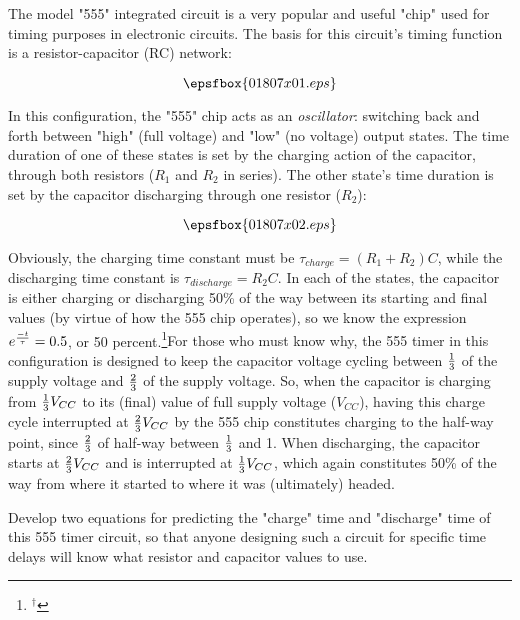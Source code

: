 

The model "555" integrated circuit is a very popular and useful "chip" used for timing purposes in electronic circuits.  The basis for this circuit's timing function is a resistor-capacitor (RC) network:

$$\epsfbox{01807x01.eps}$$

In this configuration, the "555" chip acts as an {\it oscillator}: switching back and forth between "high" (full voltage) and "low" (no voltage) output states.  The time duration of one of these states is set by the charging action of the capacitor, through both resistors ($R_1$ and $R_2$ in series).  The other state's time duration is set by the capacitor discharging through one resistor ($R_2$):

$$\epsfbox{01807x02.eps}$$

Obviously, the charging time constant must be $\tau_{charge} = (R_1 + R_2)C$, while the discharging time constant is $\tau_{discharge} = R_2C$.  In each of the states, the capacitor is either charging or discharging 50\% of the way between its starting and final values (by virtue of how the 555 chip operates), so we know the expression $e^{-t \over \tau} = 0.5$, or 50 percent.\footnote{$^{\dag}$}{For those who must know why, the 555 timer in this configuration is designed to keep the capacitor voltage cycling between ${1 \over 3}$ of the supply voltage and ${2 \over 3}$ of the supply voltage.  So, when the capacitor is charging from ${1 \over 3}V_{CC}$ to its (final) value of full supply voltage ($V_{CC}$), having this charge cycle interrupted at ${2 \over 3}V_{CC}$ by the 555 chip constitutes charging to the half-way point, since ${2 \over 3}$ of half-way between ${1 \over 3}$ and 1.  When discharging, the capacitor starts at ${2 \over 3}V_{CC}$ and is interrupted at ${1 \over 3}V_{CC}$, which again constitutes 50\% of the way from where it started to where it was (ultimately) headed.}

Develop two equations for predicting the "charge" time and "discharge" time of this 555 timer circuit, so that anyone designing such a circuit for specific time delays will know what resistor and capacitor values to use.






